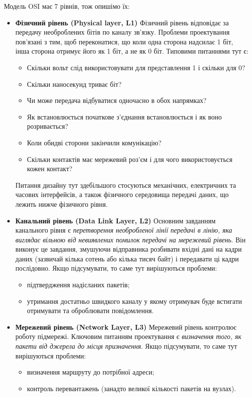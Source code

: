 Модель OSI має 7 рівнів, тож опишімо їх:
\begin{itemize}
    \item \textbf{Фізичний рівень (Physical layer, L1)}
    Фізичний рівень відповідає за передачу необроблених бітів по каналу зв'язку. Проблеми проектування пов'язані з тим, щоб переконатися, що коли одна сторона надсилає 1 біт, інша сторона отримує його як 1 біт, а не як 0 біт. Типовими питаннями тут є: 
    \begin{itemize}
        \item Скільки вольт слід використовувати для представлення 1 і скільки для 0?
        \item Скільки наносекунд триває біт?
        \item Чи може передача відбуватися одночасно в обох напрямках?
        \item Як встановлюється початкове з'єднання встановлюється і як воно розривається?
        \item Коли обидві сторони закінчили комунікацію?
        \item Скільки контактів має мережевий роз'єм і для чого використовується кожен контакт?
    \end{itemize}
    Питання дизайну тут здебільшого стосуються механічних, електричних та часових інтерфейсів, а також фізичного середовища передачі даних, що лежить нижче фізичного рівня.

    \item \textbf{Канальний рівень (Data Link Layer, L2)}
    Основним завданням канального рівня є \textit{перетворення необробленої лінії передачі в лінію, яка виглядає вільною від невиявлених помилок передачі на мережевий рівень}. Він виконує це завдання, змушуючи відправника розбивати вхідні дані на кадри даних (зазвичай кілька сотень або кілька тисяч байт) і передавати ці кадри послідовно. 
    Якщо підсумувати, то саме тут вирішуються проблеми:
    \begin{itemize}
        \item підтвердження надісланих пакетів;
        \item утримання достатньо швидкого каналу у якому отримувач буде встигати отримувати та оброблювати повідомлення.
    \end{itemize}

    \item \textbf{Мережевий рівень (Network Layer, L3)}
    Мережевий рівень контролює роботу підмережі. Ключовим питанням проектування є \textit{визначення того, як пакети від джерела до місця призначення}.
    Якщо підсумувати, то саме тут вирішуються проблеми:
    \begin{itemize}
        \item визначення маршруту до потрібної адреси;
        \item контроль перевантажень (занадто великої кількості пакетів на вузлах).
    \end{itemize}


\end{itemize}

